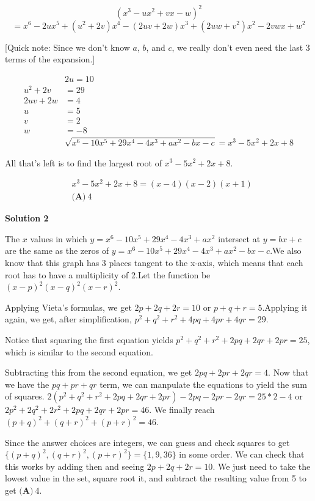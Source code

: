 \begin{enumerate}
 
 \[(x^3-ux^2+vx-w)^2\]
 \[= x^6-2ux^5+(u^2+2v)x^4-(2uv+2w)x^3+(2uw+v^2)x^2-2vwx+w^2\]

 [Quick note: Since we don't know $a$, $b$, and $c$, we really don't even need the last 3 terms of the expansion.]

 
 \begin{align*}&2u = 10\\ u^2+2v &= 29\\ 2uv+2w &= 4\\ u &= 5\\ v &= 2\\ w &= -8\\ &\sqrt{x^6-10x^5+29x^4-4x^3+ax^2-bx-c} = x^3-5x^2+2x+8\end{align*}


 All that's left is to find the largest root of $x^3-5x^2+2x+8$.

 
 \begin{align*}&x^3-5x^2+2x+8 = (x-4)(x-2)(x+1)\\ &\boxed{\textbf{(A)}\ 4}\end{align*}





\textbf{Solution 2}

The $x$ values in which $y=x^6-10x^5+29x^4-4x^3+ax^2$ intersect at $y=bx+c$ are the same as the zeros of $y=x^6-10x^5+29x^4-4x^3+ax^2-bx-c$.We also know that this graph has 3 places tangent to the x-axis, which means that each root has to have a multiplicity of 2.Let the function be $(x-p)^2(x-q)^2(x-r)^2$. 

 Applying Vieta's formulas, we get $2p+2q+2r = 10$  or  $p+q+r = 5$.Applying it again, we get, after simplification, $p^2+q^2+r^2+4pq+4pr+4qr = 29$. 

 Notice that squaring the first equation yields $p^2+q^2+r^2+2pq+2qr+2pr= 25$, which is similar to the second equation.

 Subtracting this from the second equation, we get $2pq+2pr+2qr = 4$. Now that we have the $pq+pr+qr$ term, we can manpulate the equations to yield the sum of squares. $2(p^2+q^2+r^2+2pq+2qr+2pr)-2pq-2pr-2qr= 25*2-4$ or  $2p^2+2q^2+2r^2+2pq+2qr+2pr = 46$. We finally reach $(p+q)^2+(q+r)^2+(p+r)^2 = 46$. 

 Since the answer choices are integers, we can guess and check squares to get $\{(p+q)^2, (q+r)^2, (p+r)^2\} = \{1, 9, 36\}$ in some order. We can check that this works by adding then and seeing $2p+2q+2r = 10$. We just need to take the lowest value in the set, square root it, and subtract the resulting value from 5 to get $\boxed{\textbf{(A)}\ 4}$.


\end{enumerate}
